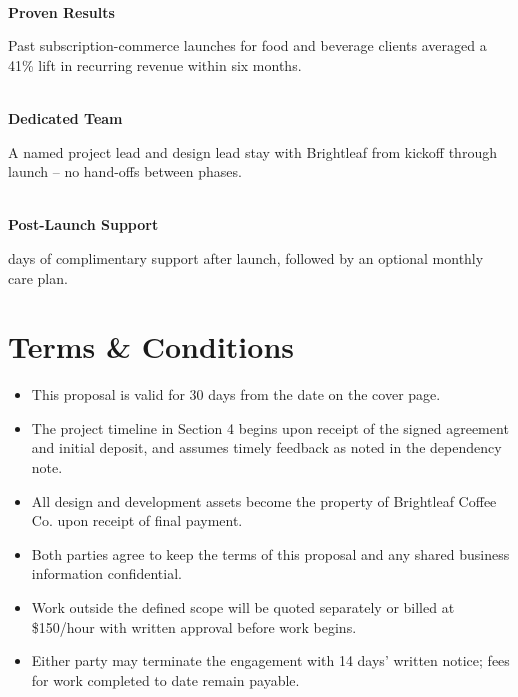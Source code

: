 \documentclass[11pt]{article}
\begin{document}
\noindent
\begin{minipage}[t]{0.315\linewidth}
  \begin{tcolorbox}[statbox]
    \centering{\Large\color{accent2}\faChartBar}\\[4pt]
    \textbf{\color{accent}Proven Results}\\[3pt]
    {\small\color{softgray}\raggedright\justifying
    Past subscription-commerce launches for food and beverage clients averaged a 41\% lift in
    recurring revenue within six months.}
  \end{tcolorbox}
\end{minipage}\hfill
\begin{minipage}[t]{0.315\linewidth}
  \begin{tcolorbox}[statbox]
    \centering{\Large\color{accent2}\faUsers}\\[4pt]
    \textbf{\color{accent}Dedicated Team}\\[3pt]
    {\small\color{softgray}\raggedright\justifying
    A named project lead and design lead stay with Brightleaf from kickoff through launch --
    no hand-offs between phases.}
  \end{tcolorbox}
\end{minipage}\hfill
\begin{minipage}[t]{0.315\linewidth}
  \begin{tcolorbox}[statbox]
    \centering{\Large\color{accent2}\faLifeRing}\\[4pt]
    \textbf{\color{accent}Post-Launch Support}\\[3pt]
    {\small\color{softgray}\raggedright{} days of complimentary support after launch, followed by an optional monthly care plan.}
  \end{tcolorbox}
\end{minipage}

\section{Terms \& Conditions}

\begin{itemize}
  \item This proposal is valid for 30 days from the date on the cover page.
  \item The project timeline in Section 4 begins upon receipt of the signed agreement and initial
        deposit, and assumes timely feedback as noted in the dependency note.
  \item All design and development assets become the property of Brightleaf Coffee Co. upon
        receipt of final payment.
  \item Both parties agree to keep the terms of this proposal and any shared business information
        confidential.
  \item Work outside the defined scope will be quoted separately or billed at \$150/hour with
        written approval before work begins.
  \item Either party may terminate the engagement with 14 days' written notice; fees for work
        completed to date remain payable.
\end{itemize}
\end{document}
